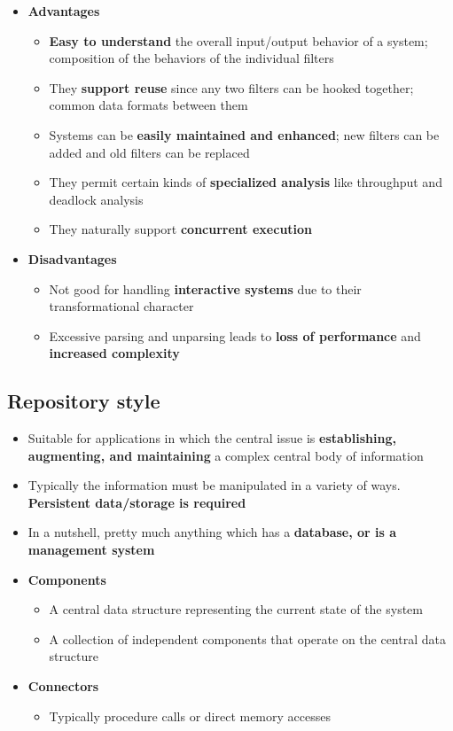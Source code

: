 \documentclass[12pt]{book}
\begin{document}
\begin{itemize}
    
    \item \textbf{Advantages}
    \begin{itemize}
        \item \textbf{Easy to understand} the overall input/output behavior of a system; composition of the behaviors of the individual filters
        \item They \textbf{support reuse} since any two filters can be hooked together; common data formats between them
        \item Systems can be \textbf{easily maintained and enhanced}; new filters can be added and old filters can be replaced
        \item They permit certain kinds of \textbf{specialized analysis} like throughput and deadlock analysis
        \item They naturally support \textbf{concurrent execution}
    \end{itemize} 

    \item \textbf{Disadvantages}
    \begin{itemize}
        \item Not good for handling \textbf{interactive systems} due to their transformational character
        \item Excessive parsing and unparsing leads to \textbf{loss of performance} and \textbf{increased complexity}
    \end{itemize}
\end{itemize}

\subsection*{Repository style}
\begin{itemize}
    \item Suitable for applications in which the central issue is \textbf{establishing, augmenting, and maintaining} a complex central body of information
    \item Typically the information must be manipulated in a variety of ways. \textbf{Persistent data/storage is required}
    \item In a nutshell, pretty much anything which has a \textbf{database, or is a management system}
    
    \item \textbf{Components}
    \begin{itemize}
        \item A central data structure representing the current state of the system
        \item A collection of independent components that operate on the central data structure
    \end{itemize} 

    \item \textbf{Connectors}
    \begin{itemize}
        \item Typically procedure calls or direct memory accesses
    \end{itemize} 
\end{itemize}
\end{document}
